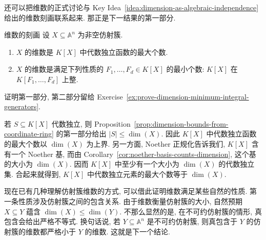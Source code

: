 还可以把维数的正式讨论与 Key Idea~\ref{idea:dimension-as-algebraic-independence} 给出的维数刻画联系起来. 那正是下一结果的第一部分.

\begin{Corollary}{维数的刻画}\leavevmode\label{cor:dimension-and-algebraic-independence}
设 $X\subseteq\mathbb{A}^{n}$ 为非空仿射簇.
\begin{enumerate}
  \item $X$ 的维数是 $K[X]$ 中代数独立函数的最大个数.
  \item\label{part:dimension-as-minimum-integral-generators} $X$ 的维数是满足下列性质的 $F_{1},\ldots,F_{d}\in K[X]$ 的最小个数: $K[X]$ 在 $K[F_{1},\ldots,F_{d}]$ 上整.
\end{enumerate}
\end{Corollary}
\begin{Proof}
证明第一部分, 第二部分留给 Exercise~\ref{ex:prove-dimension-minimum-integral-generators}.

若 $S\subseteq K[X]$ 代数独立, 则 Proposition~\ref{prop:dimension-bounds-from-coordinate-ring} 的第一部分给出 $|S|\leq\dim(X)$. 因此 $K[X]$ 中代数独立函数的最大个数以 $\dim(X)$ 为上界. 另一方面, Noether 正规化告诉我们, $K[X]$ 含有一个 Noether 基, 而由 Corollary~\ref{cor:noether-basis-counts-dimension}, 这个基的大小为 $\dim(X)$. 因而 $K[X]$ 中至少有一个大小为 $\dim(X)$ 的代数独立集. 合起来就得到, $K[X]$ 中代数独立元素的最大个数等于 $\dim(X)$.
\end{Proof}

现在已有几种理解仿射簇维数的方式, 可以借此证明维数满足某些自然的性质. 第一条性质涉及仿射簇之间的包含关系. 由于维数衡量仿射簇的大小, 自然预期 $X\subseteq Y$ 蕴含 $\dim(X)\leq\dim(Y)$. 不那么显然的是, 在不可约仿射簇的情形, 真包含会给出严格不等式. 换句话说, 若 $Y\subseteq\mathbb{A}^{n}$ 是不可约仿射簇, 则真包含于 $Y$ 的仿射簇的维数都严格小于 $Y$ 的维数. 这就是下一个结论.

